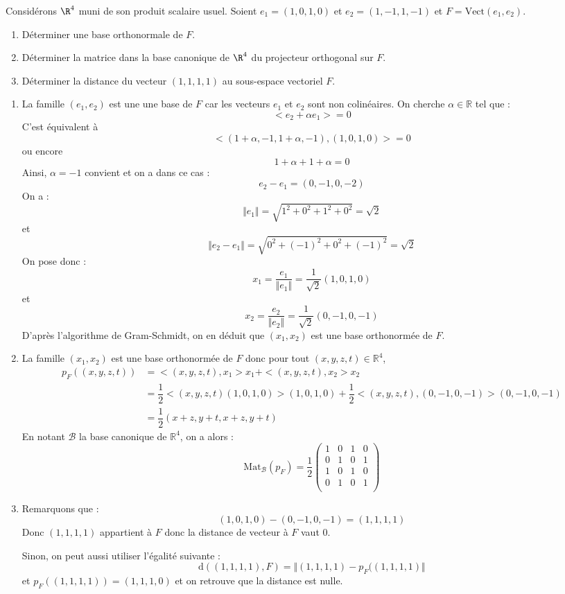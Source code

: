\documentclass[a4paper,10pt]{report}
\begin{document}
\begin{Exercice}{} Considérons $\R^4$ muni de son produit scalaire usuel. Soient $e_1=(1,0,1,0)$ et $e_2=(1,-1,1,-1)$ et $F=\textrm{Vect}(e_1,e_2)$.
\begin{enumerate}
    \item  D\'eterminer une base orthonormale de $F.$
    \item  D\'eterminer la matrice dans la base canonique de $\R^4$ du projecteur orthogonal
sur $F.$
    \item  D\'eterminer la distance du vecteur $(1,1,1,1)$ au sous-espace vectoriel  $F.$
\end{enumerate}
\end{Exercice}

\corr 

\begin{enumerate}
\item La famille $(e_1,e_2)$ est une une base de $F$ car les vecteurs $e_1$ et $e_2$ sont non colinéaires. On cherche $\alpha \in \mathbb{R}$ tel que :
$$ <e_2+ \alpha e_1>= 0$$
C'est équivalent à 
$$ <(1+ \alpha,-1,1+ \alpha,-1),(1,0,1,0)>=0$$
ou encore 
$$ 1+ \alpha + 1 +  \alpha = 0$$
Ainsi, $\alpha=-1$ convient et on a dans ce cas :
$$ e_2-e_1 = (0,-1,0,-2)$$
On a :
$$ \Vert e_1 \Vert = \sqrt{1^2+0^2+1^2+0^2}= \sqrt{2}$$
et 
$$ \Vert e_2-e_1 \Vert = \sqrt{0^2+(-1)^2+0^2+(-1)^2} = \sqrt{2}$$
On pose donc :
$$ x_1 = \dfrac{e_1}{\Vert e_1 \Vert} = \dfrac{1}{\sqrt{2}} (1,0,1,0)$$
et 
$$ x_2 = \dfrac{e_2}{\Vert e_2 \Vert}  = \dfrac{1}{\sqrt{2}}(0,-1,0,-1)$$
D'après l'algorithme de Gram-Schmidt, on en déduit que $(x_1,x_2)$ est une base orthonormée de $F$.
\item La famille $(x_1,x_2)$ est une base orthonormée de $F$ donc pour tout $(x,y,z,t) \in \mathbb{R}^4$,
\begin{align*}
p_F((x,y,z,t)) & = <(x,y,z,t),x_1>x_1 + <(x,y,z,t),x_2>x_2 \\
& = \dfrac{1}{2} <(x,y,z,t)(1,0,1,0)>(1,0,1,0) + \dfrac{1}{2} <(x,y,z,t),(0,-1,0,-1)>(0,-1,0,-1) \\
& = \dfrac{1}{2} (x+z,y+t ,x+z, y+t)
\end{align*}
En notant $\mathcal{B}$ la base canonique de $\mathbb{R}^4$, on a alors :
$$ \textrm{Mat}_{\mathcal{B}}(p_F) =\dfrac{1}{2} \begin{pmatrix}
1 & 0 & 1 & 0 \\
0 & 1  &  0 & 1 \\
1 & 0& 1 & 0\\
0& 1 &  0 & 1\\
\end{pmatrix}$$
\item Remarquons que :
$$ (1,0,1,0)-(0,-1,0,-1) = (1,1,1,1)$$
Donc $(1,1,1,1)$ appartient à $F$ donc la distance de vecteur à $F$ vaut $0$.

\medskip

\noindent Sinon, on peut aussi utiliser l'égalité suivante :
$$ \textrm{d}((1,1,1,1),F) = \Vert (1,1,1,1)-p_F((1,1,1,1) \Vert$$
et $p_F((1,1,1,1))=(1,1,1,0)$ et on retrouve que la distance est nulle.
\end{enumerate}
\end{document}
